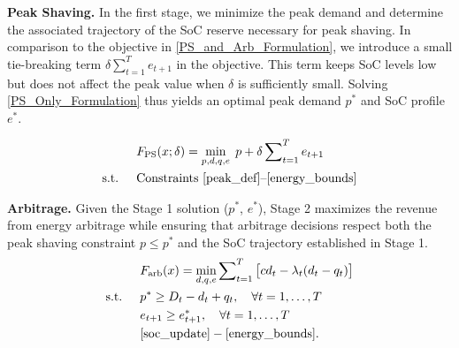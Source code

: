 \documentclass[conference]{IEEEtran}
\begin{document}

\textbf{Peak Shaving.} 
In the first stage, we minimize the peak demand and determine the associated trajectory of the SoC reserve necessary for peak shaving. In comparison to the objective in \eqref{PS_and_Arb_Formulation}, we introduce a small tie-breaking term $\delta \sum_{t=1}^T e_{t+1}$ in the objective. This term keeps SoC levels low but does not affect the peak value when $\delta$ is sufficiently small. Solving \eqref{PS_Only_Formulation} thus yields an optimal peak demand $p^*$ and SoC profile $e^*$. 

\begin{equation}\label{PS_Only_Formulation}
\begin{aligned}
& F_{\text{PS}}(x;\delta) = \min_{p,d,q,e} \; p + \delta \sum\nolimits_{t=1}^T e_{t+1} \\
\text{s.t. } \quad
& \text{Constraints \eqref{peak_def}--\eqref{energy_bounds}}
\end{aligned}
\end{equation}


\textbf{Arbitrage.} 
Given the Stage 1 solution ($p^*$, $e^*$), Stage 2 maximizes the revenue from energy arbitrage while ensuring that arbitrage decisions respect both the peak shaving constraint $p \le p^*$ and the SoC trajectory established in Stage 1.
\begin{subequations}\label{Arb_Formulation_Stage2}
\begin{align}
& F_{\text{arb}}(x) = \min_{d,q,e} \sum\nolimits_{t=1}^T \big[ c d_t - \lambda_t (d_t - q_t) \big]
\label{arb_obj_min} \\
\text{s.t. } \quad
& p^* \ge D_t - d_t + q_t, 
\quad \forall t = 1,\dots,T
\label{peak_const_stage2} \\
& e_{t+1} \ge e_{t+1}^*, 
\quad \forall t = 1,\dots,T
\label{PS_SOC_min_stage2} \\
&  \eqref{soc_update}-\eqref{energy_bounds}. \nonumber
\end{align}
\end{subequations}
\end{document}
